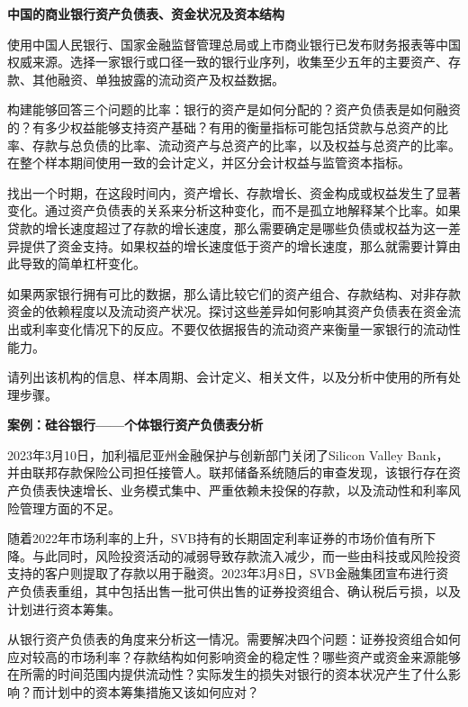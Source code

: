 
\textbf{中国的商业银行资产负债表、资金状况及资本结构}

使用中国人民银行、国家金融监督管理总局或上市商业银行已发布财务报表等中国权威来源。选择一家银行或口径一致的银行业序列，收集至少五年的主要资产、存款、其他融资、单独披露的流动资产及权益数据。

构建能够回答三个问题的比率：银行的资产是如何分配的？资产负债表是如何融资的？有多少权益能够支持资产基础？有用的衡量指标可能包括贷款与总资产的比率、存款与总负债的比率、流动资产与总资产的比率，以及权益与总资产的比率。在整个样本期间使用一致的会计定义，并区分会计权益与监管资本指标。

找出一个时期，在这段时间内，资产增长、存款增长、资金构成或权益发生了显著变化。通过资产负债表的关系来分析这种变化，而不是孤立地解释某个比率。如果贷款的增长速度超过了存款的增长速度，那么需要确定是哪些负债或权益为这一差异提供了资金支持。如果权益的增长速度低于资产的增长速度，那么就需要计算由此导致的简单杠杆变化。

如果两家银行拥有可比的数据，那么请比较它们的资产组合、存款结构、对非存款资金的依赖程度以及流动资产状况。探讨这些差异如何影响其资产负债表在资金流出或利率变化情况下的反应。不要仅依据报告的流动资产来衡量一家银行的流动性能力。

请列出该机构的信息、样本周期、会计定义、相关文件，以及分析中使用的所有处理步骤。



\textbf{案例：硅谷银行——个体银行资产负债表分析}

2023年3月10日，加利福尼亚州金融保护与创新部门关闭了Silicon Valley Bank，并由联邦存款保险公司担任接管人。联邦储备系统随后的审查发现，该银行存在资产负债表快速增长、业务模式集中、严重依赖未投保的存款，以及流动性和利率风险管理方面的不足。

随着2022年市场利率的上升，SVB持有的长期固定利率证券的市场价值有所下降。与此同时，风险投资活动的减弱导致存款流入减少，而一些由科技或风险投资支持的客户则提取了存款以用于融资。2023年3月8日，SVB金融集团宣布进行资产负债表重组，其中包括出售一批可供出售的证券投资组合、确认税后亏损，以及计划进行资本筹集。

从银行资产负债表的角度来分析这一情况。需要解决四个问题：证券投资组合如何应对较高的市场利率？存款结构如何影响资金的稳定性？哪些资产或资金来源能够在所需的时间范围内提供流动性？实际发生的损失对银行的资本状况产生了什么影响？而计划中的资本筹集措施又该如何应对？

